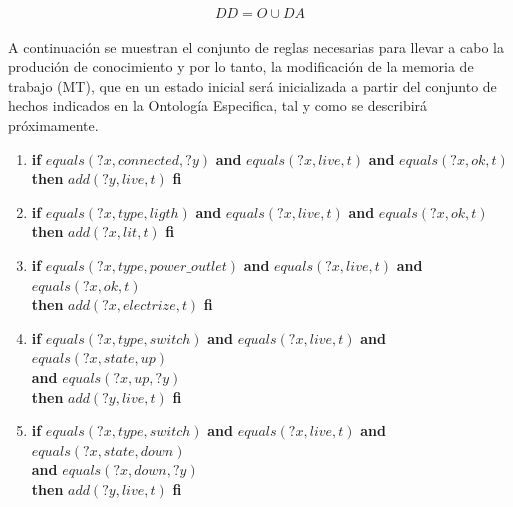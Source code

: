 \documentclass[10pt, a4paper,spanish]{article}
\begin{document}
			\begin{equation*}
				DD = O \cup DA
			\end{equation*}

			\paragraph{}
			A continuación se muestran el conjunto de reglas necesarias para llevar a cabo la produción de conocimiento y por lo tanto, la modificación de la memoria de trabajo (MT), que en un estado inicial será inicializada a partir del conjunto de hechos indicados en la Ontología Especifica, tal y como se describirá próximamente.

			\begin{enumerate}[label={\textbf{R\theenumi:}}]
				\item
					\textbf{if} $equals(?x, connected, ?y)$ \textbf{and} $equals(?x, live, t)$ \textbf{and} $equals(?x, ok, t)$ \\
					\textbf{then} $add(?y, live, t)$ \textbf{fi}

				\item
					\textbf{if} $equals(?x, type, ligth)$ \textbf{and} $equals(?x, live, t)$ \textbf{and} $equals(?x, ok, t)$ \\
					\textbf{then} $add(?x, lit, t)$ \textbf{fi}

				\item
					\textbf{if} $equals(?x, type, power\_outlet)$ \textbf{and} $equals(?x, live, t)$ \textbf{and} $equals(?x, ok, t)$ \\
					\textbf{then} $add(?x, electrize, t)$ \textbf{fi}

				\item
					\textbf{if} $equals(?x, type, switch)$ \textbf{and} $equals(?x, live, t)$ \textbf{and} $equals(?x, state, up)$ \\
					\hspace*{0.5cm} \textbf{and} $equals(?x, up, ?y)$ \\
					\textbf{then} $add(?y, live, t)$ \textbf{fi}

				\item
					\textbf{if} $equals(?x, type, switch)$ \textbf{and} $equals(?x, live, t)$ \textbf{and} $equals(?x, state, down)$ \\
					\hspace*{0.5cm} \textbf{and} $equals(?x, down, ?y)$ \\
					\textbf{then} $add(?y, live, t)$ \textbf{fi}
			\end{enumerate}
\end{document}
